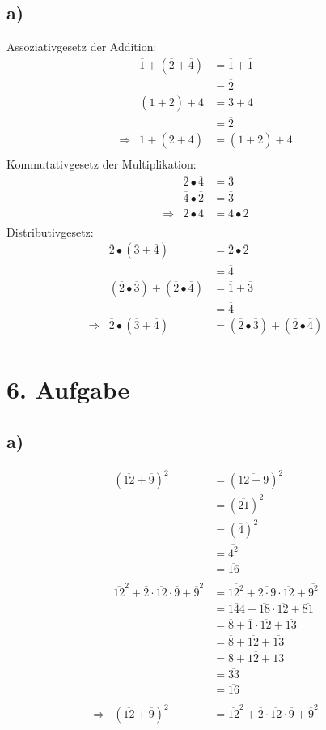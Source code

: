\documentclass[]{article}
\newcommand{\T}[1]{\overline{#1}}
\newcommand{\rarr}{\Rightarrow}
\begin{document}
\subsection*{a)}
Assoziativgesetz der Addition:
\begin{align*}
	&& \T{1} + (\T{2} + \T{4}) &= \T{1} + \T{1} &&\\
	&& &= \T{2} &&\\
	&& (\T{1} + \T{2}) + \T{4} &= \T{3} + \T{4} &&\\
	&& &= \T{2} &&\\
	&\rarr& \T{1} + (\T{2} + \T{4}) &= (\T{1} + \T{2}) + \T{4} &&\\
\end{align*}
Kommutativgesetz der Multiplikation:
\begin{align*}
	&& \T{2} \bullet \T{4} &= \T{3} &&\\
	&& \T{4} \bullet \T{2} &= \T{3} &&\\
	&\rarr& \T{2} \bullet \T{4} &= \T{4} \bullet \T{2} &&\\
\end{align*}
Distributivgesetz:
\begin{align*}
	&& \T{2} \bullet (\T{3} + \T{4}) &= \T{2} \bullet \T{2} &&\\
	&& &= \T{4} &&\\
	&& (\T{2} \bullet \T{3}) + (\T{2} \bullet \T{4}) &= \T{1} + \T{3} &&\\
	&& &= \T{4} &&\\
	&\rarr& \T{2} \bullet (\T{3} + \T{4}) &= (\T{2} \bullet \T{3}) + (\T{2} \bullet \T{4}) &&\\
\end{align*}

\section*{6. Aufgabe}
\subsection*{a)}
	\begin{align*}
		&& (\T{12} + \T{9})^2 &= (\T{12+9})^2 &&\\
		&& &= (\T{21})^2 &&\\
		&& &= (\T{4})^2 &&\\
		&& &= \T{4^2} &&\\
		&& &= \T{16} &&\\
		\\
		&& \T{12}^2 + \T{2} \cdot \T{12} \cdot \T{9} + \T{9}^2  &= \T{12^2} + \T{2 \cdot 9} \cdot \T{12} + \T{9^2} &&\\
		&& &= \T{144} + \T{18} \cdot \T{12}  + \T{81} &&\\
		&& &= \T{8} + \T{1} \cdot \T{12}  + \T{13} &&\\
		&& &= \T{8} + \T{12}  + \T{13} &&\\
		&& &= \T{8+12+13} &&\\
		&& &= \T{33} &&\\
		&& &= \T{16} &&\\
		\\
		&\rarr& (\T{12} + \T{9})^2 &= \T{12}^2 + \T{2} \cdot \T{12} \cdot \T{9} + \T{9}^2 &&\\
	\end{align*}
\end{document}
